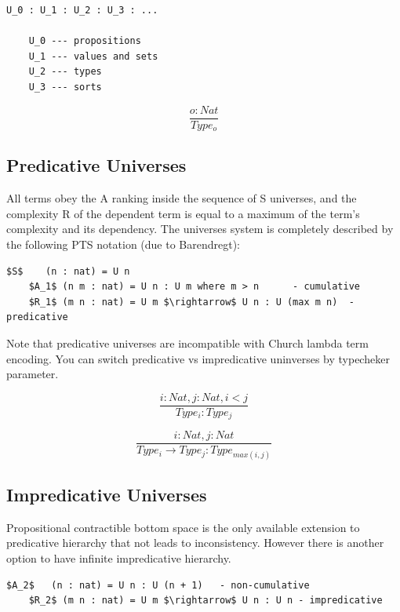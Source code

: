 \documentclass[11pt,oneside]{article}
\begin{document}
\vspace{0.5cm}
\begin{lstlisting}[mathescape=true]
    U_0 : U_1 : U_2 : U_3 : ...

    U_0 --- propositions
    U_1 --- values and sets
    U_2 --- types
    U_3 --- sorts
\end{lstlisting}

\begin{equation}
\tag{S}
\dfrac
{o : Nat}
{Type_o}
\end{equation}

\subsection{Predicative Universes}

All terms obey the A ranking inside the sequence of S universes,
and the complexity R of the dependent term is equal to a maximum of
the term's complexity and its dependency.
The universes system is completely described by the following
PTS notation (due to Barendregt):

\vspace{0.5cm}
\begin{lstlisting}[mathescape=true]
    $S$    (n : nat) = U n
    $A_1$ (n m : nat) = U n : U m where m > n      - cumulative
    $R_1$ (m n : nat) = U m $\rightarrow$ U n : U (max m n)  - predicative
\end{lstlisting}

Note that predicative universes are incompatible with Church lambda term encoding.
You can switch predicative vs impredicative uninverses by typecheker parameter.

\[
\tag{$A_1$}
\dfrac{i: Nat, j: Nat, i < j}{Type_i : Type_j}
\]

\[
\tag{$R_1$}
\dfrac{i : Nat, j : Nat}{Type_i \rightarrow Type_j : Type_{max(i,j)} }
\]

\subsection{Impredicative Universes}
Propositional contractible bottom space is the only
available extension to predicative hierarchy that not leads to inconsistency.
However there is another option to have infinite
impredicative hierarchy.

\vspace{0.5cm}
\begin{lstlisting}[mathescape=true]
    $A_2$   (n : nat) = U n : U (n + 1)   - non-cumulative
    $R_2$ (m n : nat) = U m $\rightarrow$ U n : U n - impredicative
\end{lstlisting}
\end{document}
